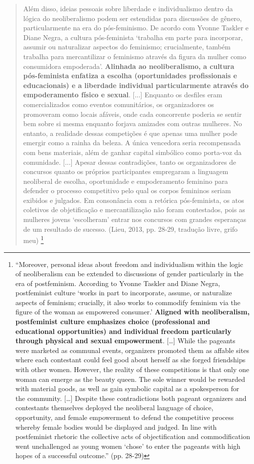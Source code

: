 \begin{quote}
    Além disso, ideias pessoais sobre liberdade e individualismo dentro da lógica do neoliberalismo podem ser estendidas para discussões de gênero, particularmente na era do pós-feminismo. De acordo com Yvonne Taskler e Diane Negra, a cultura pós-feminista ‘trabalha em parte para incorporar, assumir ou naturalizar aspectos do feminismo; crucialmente, também trabalha para mercantilizar o feminismo através da figura da mulher como consumidora empoderada’. \textbf{Alinhada ao neoliberalismo, a cultura pós-feminista enfatiza a escolha (oportunidades profissionais e educacionais) e a liberdade individual particularmente através do empoderamento físico e sexual}. [...] Enquanto os desfiles eram comercializados como eventos comunitários, os organizadores os promoveram como locais afáveis, onde cada concorrente poderia se sentir bem sobre si mesma enquanto forjava amizades com outras mulheres. No entanto, a realidade dessas competições é que apenas uma mulher pode emergir como a rainha da beleza. A única vencedora seria recompensada com bens materiais, além de ganhar capital simbólico como porta-voz da comunidade. [...] Apesar dessas contradições, tanto os organizadores de concursos quanto os próprios participantes empregaram a linguagem neoliberal de escolha, oportunidade e empoderamento feminino para defender o processo competitivo pelo qual os corpos femininos seriam exibidos e julgados. Em consonância com a retórica pós-feminista, os atos coletivos de objetificação e mercantilização não foram contestados, pois as mulheres jovens ‘escolheram’ entrar nos concursos com grandes esperanças de um resultado de sucesso. (Lieu, 2013, pp. 28-29, tradução livre, grifo meu) \footnote{“Moreover, personal ideas about freedom and individualism within the logic of neoliberalism can be extended to discussions of gender particularly in the era of postfeminism. According to Yvonne Taskler and Diane Negra, postfeminist culture ‘works in part to incorporate, assume, or naturalize aspects of feminism; crucially, it also works to commodify feminism via the figure of the woman as empowered consumer.’ \textbf{Aligned with neoliberalism, postfeminist culture emphasizes choice (professional and educational opportunities) and individual freedom particularly through physical and sexual empowerment}. […] While the pageants were marketed as communal events, organizers promoted them as affable sites where each contestant could feel good about herself as she forged friendships with other women. However, the reality of these competitions is that only one woman can emerge as the beauty queen. The sole winner would be rewarded with material goods, as well as gain symbolic capital as a spokesperson for the community. […] Despite these contradictions both pageant organizers and contestants themselves deployed the neoliberal language of choice, opportunity, and female empowerment to defend the competitive process whereby female bodies would be displayed and judged. In line with postfeminist rhetoric the collective acts of objectification and commodification went unchallenged as young women ‘chose’ to enter the pageants with high hopes of a successful outcome.” (pp. 28-29)}
\end{quote}

